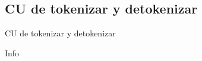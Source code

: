 %
%
%

\subsection{CU de tokenizar y detokenizar}

\begin{frame}{CU de tokenizar y detokenizar}
  
  Info


\end{frame}

